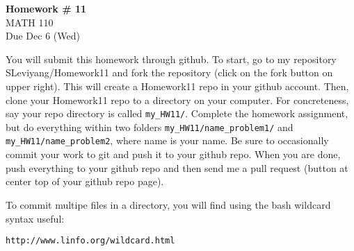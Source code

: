 \documentclass{article}
\begin{document}
\renewcommand{\a}{\textbf{a}}
\renewcommand{\b}{\textbf{b}}
\renewcommand{\d}{\textbf{d}}
\newcommand{\e}{\textbf{e}}

\large

\begin{center}
\textbf{Homework \# 11} \\  
MATH 110\\
Due Dec 6 (Wed)
\end{center}

\medskip

You will submit this homework through github.   To start, go to my repository SLeviyang/Homework11 and fork the repository (click on the fork button on upper right).  This will create a Homework11 repo in your github account.   Then, clone your Homework11 repo to a directory on your computer.  For concreteness, say your repo directory is called \verb+my_HW11/+.   Complete the homework assignment, but do everything within two folders \verb+my_HW11/name_problem1/+ and \verb+my_HW11/name_problem2+, where name is your name.   Be sure to occasionally commit your work to git and push it to your github repo.   When you are done, push everything to your github repo and then send me a pull request (button at center top of your github repo page).  

\vspace{.5cm}

To commit multipe files in a directory, you will find using the bash wildcard syntax useful:
\begin{verbatim}
http://www.linfo.org/wildcard.html
\end{verbatim}

\vspace{.5cm}
\end{document}
